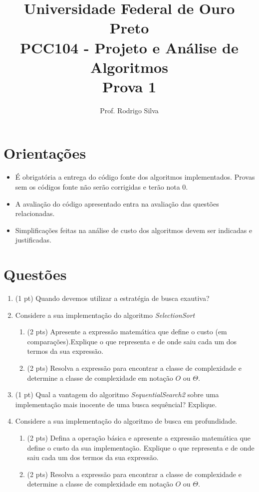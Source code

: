 \documentclass{article}
\title{\vspace{-2 cm}Universidade Federal de Ouro Preto \\ PCC104 - Projeto e Análise de Algoritmos \\ Prova 1}
\author{Prof. Rodrigo Silva}
\begin{document}
\maketitle

\section*{Orientações}

\begin{itemize}
    \item É obrigatória a entrega do código fonte dos algoritmos implementados. Provas sem os códigos fonte não serão corrigidas e terão nota 0.
    \item A avaliação do código apresentado entra na avaliação das questões relacionadas. 
    \item Simplificações feitas na análise de custo dos algoritmos devem ser indicadas e justificadas.
\end{itemize}

\section*{Questões}

\begin{enumerate}
    \item (1 pt) Quando devemos utilizar a estratégia de busca exautiva?
    
    \item Considere a sua implementação do algoritmo \textit{SelectionSort}

    \begin{enumerate}
        \item (2 pts) Apresente a expressão matemática que define o custo (em comparações).Explique o que representa e de onde saiu cada um dos termos da sua expressão. 
        \item (2 pts) Resolva a expressão para encontrar a classe de complexidade e determine a classe de complexidade em notação $O$ ou $\Theta$. 
    \end{enumerate}

    \item (1 pt) Qual a vantagem do algoritmo \textit{SequentialSearch2} sobre uma implementação mais inocente de uma busca sequêncial? Explique.
    
    \item Considere a sua implementação do algoritmo de busca em profundidade.
    \begin{enumerate}
        \item (2 pts) Defina a operação básica e apresente a expressão matemática que define o custo da sua implementação. Explique o que representa e de onde saiu cada um dos termos da sua expressão. 
        \item (2 pts) Resolva a expressão para encontrar a classe de complexidade e determine a classe de complexidade em notação $O$ ou $\Theta$.
    \end{enumerate}

\end{enumerate}


%
%
\end{document}
